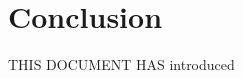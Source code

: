\chapter{Conclusion}{}
\label{sec:conclusion}

\lettrine[lraise=0.1, nindent=0em, slope=-.5em]{T}{HIS DOCUMENT HAS} introduced
